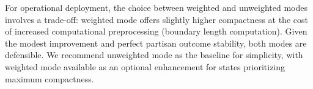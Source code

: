 For operational deployment, the choice between weighted and unweighted modes involves a trade-off: weighted mode offers slightly higher compactness at the cost of increased computational preprocessing (boundary length computation). Given the modest improvement and perfect partisan outcome stability, both modes are defensible. We recommend unweighted mode as the baseline for simplicity, with weighted mode available as an optional enhancement for states prioritizing maximum compactness.
